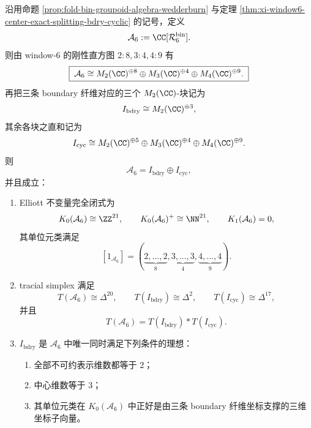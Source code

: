 \begin{theorem}\label{thm:derived-window6-groupoid-elliott-boundary-face}
沿用命题 \ref{prop:fold-bin-groupoid-algebra-wedderburn} 与定理 \ref{thm:xi-window6-center-exact-splitting-bdry-cyclic} 的记号，定义
\[
\mathcal A_6:=\CC[\mathcal R_6^{\mathrm{bin}}].
\]
则由 window-\(6\) 的刚性直方图 \(2:8,3:4,4:9\) 有
\[
\boxed{\;
\mathcal A_6
\cong
M_2(\CC)^{\oplus 8}\oplus M_3(\CC)^{\oplus 4}\oplus M_4(\CC)^{\oplus 9}.\;}
\]
再把三条 boundary 纤维对应的三个 \(M_2(\CC)\)-块记为
\[
I_{\mathrm{bdry}}\cong M_2(\CC)^{\oplus 3},
\]
其余各块之直和记为
\[
I_{\mathrm{cyc}}
\cong
M_2(\CC)^{\oplus 5}\oplus M_3(\CC)^{\oplus 4}\oplus M_4(\CC)^{\oplus 9}.
\]
则
\[
\mathcal A_6=I_{\mathrm{bdry}}\oplus I_{\mathrm{cyc}},
\]
并且成立：
\begin{enumerate}
  \item Elliott 不变量完全闭式为
  \[
  K_0(\mathcal A_6)\cong \ZZ^{21},
  \qquad
  K_0(\mathcal A_6)^+\cong \NN^{21},
  \qquad
  K_1(\mathcal A_6)=0,
  \]
  其单位元类满足
  \[
  \boxed{\;
  [1_{\mathcal A_6}]
  =
  (\underbrace{2,\dots,2}_{8},
  \underbrace{3,\dots,3}_{4},
  \underbrace{4,\dots,4}_{9}).\;}
  \]
  \item tracial simplex 满足
  \[
  T(\mathcal A_6)\cong \Delta^{20},
  \qquad
  T(I_{\mathrm{bdry}})\cong \Delta^{2},
  \qquad
  T(I_{\mathrm{cyc}})\cong \Delta^{17},
  \]
  并且
  \[
  \boxed{\;
  T(\mathcal A_6)=T(I_{\mathrm{bdry}})\ast T(I_{\mathrm{cyc}}).\;}
  \]
  \item \(I_{\mathrm{bdry}}\) 是 \(\mathcal A_6\) 中唯一同时满足下列条件的理想：
  \begin{enumerate}
    \item 全部不可约表示维数都等于 \(2\)；
    \item 中心维数等于 \(3\)；
    \item 其单位元类在 \(K_0(\mathcal A_6)\) 中正好是由三条 boundary 纤维坐标支撑的三维坐标子向量。
  \end{enumerate}
\end{enumerate}
\end{theorem}
